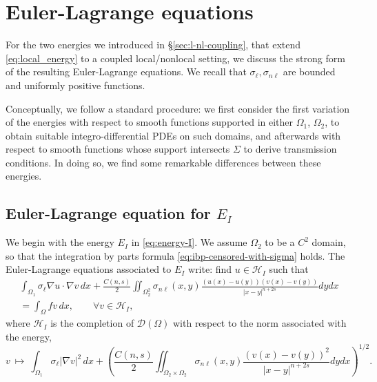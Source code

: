 \documentclass{amsart}
\newcommand{\Ol}{\Omega_{1}}%
\newcommand{\Onl}{\Omega_{2}}%
\renewcommand{\sl}{{\sigma_\ell}}
\newcommand{\snl}{{\sigma_{n\ell}}}
\def\calH{\mathcal{H}}
\def\Om{\Omega}
\theoremstyle{plain}
\numberwithin{equation}{section}
\numberwithin{table}{section}
\numberwithin{figure}{section}
\numberwithin{theorem}{section}
\numberwithin{corollary}{section}
\numberwithin{definition}{section}
\numberwithin{lemma}{section}
\numberwithin{proposition}{section}
\numberwithin{remark}{section}
\begin{document}
\section{Euler-Lagrange equations}\label{sec_EulerLagrange}
For the two energies we introduced in \S\ref{sec:l-nl-coupling}, that extend \eqref{eq:local_energy} to a coupled local/nonlocal setting, we discuss the strong form of the resulting Euler-Lagrange equations. We recall that $\sl, \snl$ are bounded and uniformly positive functions.

Conceptually, we follow a standard procedure: we first consider the first variation of the energies with respect to smooth functions supported in either $\Ol$, $\Onl$, to obtain suitable integro-differential PDEs on such domains, and afterwards with respect to smooth functions whose support intersects $\Sigma$ to derive transmission conditions. In doing so, we find some remarkable differences between these energies.

\subsection{Euler-Lagrange equation for $E_{I}$}\label{subsec_Euler-Lagrange_I}
We begin with the energy $E_{I}$ in \eqref{eq:energy-I}. We assume $\Onl$ to be a $C^2$ domain, so that the integration by parts formula \eqref{eq:ibp-censored-with-sigma} holds. The Euler-Lagrange equations associated to $E_I$ write: find $u\in \calH_{I}$ such that
\begin{equation} \label{eq:Euler-Lagrange-E_I} \begin{aligned}
 \int_{\Ol} \sl \nabla u \cdot \nabla v\, dx + \frac{ C(n,s) }{2} \iint_{\Onl^2} \snl(x,y) \frac{(u(x)-u(y))(v(x)-v(y))}{|x-y|^{n+2s}} dy dx  \\
= \int_\Omega f v \, dx, \qquad \forall v \in \mathcal{H}_{I},
\end{aligned}
\end{equation}
where $\mathcal{H}_{I}$ is the completion of ${\mathcal D}(\Om)$ with respect to the norm associated with the energy,
\[ v \ \mapsto\ \int_{\Ol} \sl |\nabla v|^2\, dx+ \left( \frac{ C(n,s) }{2} \iint_{\Onl\times\Onl} \snl(x,y) \frac{(v(x)-v(y))^2}{|x-y|^{n+2s}} dy dx \right)^{1/2}.\]

\smallskip
\end{document}
